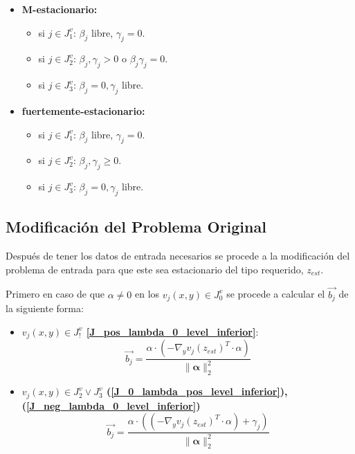 \begin{itemize}
\item[]\begin{center} {\textbf{ M-estacionario:}} \end{center}\begin{itemize}\item si $j\in J_1^v$: $\beta_j$ libre, $\gamma_j=0$.\item si $j\in J_2^v$: $\beta_j,\gamma_j> 0$ o $\beta_j\gamma_j=0$.\item si $j\in J_3^v$: $\beta_j=0,\gamma_j$ libre.\end{itemize}
\item[]\begin{center} {\textbf{fuertemente-estacionario:}} \end{center}\begin{itemize}\item si $j\in J_1^v$: $\beta_j$ libre, $\gamma_j=0$.\item si $j\in J_2^v$: $\beta_j,\gamma_j\geq 0$.\item si $j\in J_3^v$: $\beta_j=0,\gamma_j$ libre.
\end{itemize}
\end{itemize}




\subsection{Modificación del Problema Original}
Después de tener los datos de entrada necesarios se procede a la modificación
del problema de entrada para que este sea estacionario del tipo requerido, $z_{est}$.

%
Primero en caso de que $\alpha \neq 0$ en los $v_j(x,y) \in J_0^v$ se procede a calcular el $\vec{b_j}$ de la siguiente forma:

\begin{itemize}
    \item \textbf{ $v_j(x,y) \in J_!^v$ \ref{J_pos_lambda_0_level_inferior}}:
        \begin{equation}
            \vec{b_j}=  \frac{{\alpha} \cdot (-\nabla_{y}{v_j(z_{est})}^T \cdot \alpha)}{\|\mathbf{\alpha} \|_2^2}
        \end{equation}
    \item \textbf{$v_j(x,y) \in J_2^v \lor J_3^v$ (\ref{J_0_lambda_pos_level_inferior}), (\ref{J_neg_lambda_0_level_inferior})}\\
    \begin{equation}
        \vec{b_j}=  \frac{{\alpha} \cdot ((-\nabla_{y}{v_j(z_{est})}^T \cdot \alpha)+\gamma_j)}{\|\mathbf{\alpha} \|_2^2}
    \end{equation}
\end{itemize}

